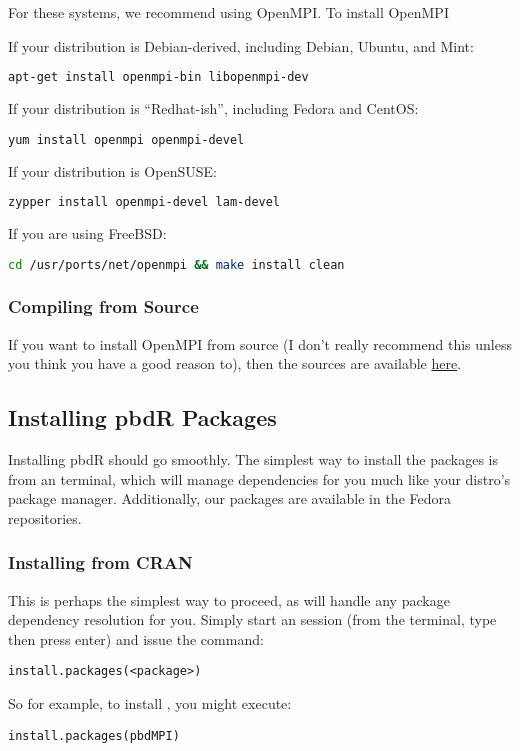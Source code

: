 For these systems, we recommend using OpenMPI.  To install OpenMPI

If your distribution is Debian-derived, including Debian, Ubuntu, and Mint:
\begin{lstlisting}[language=sh]
apt-get install openmpi-bin libopenmpi-dev
\end{lstlisting}

\vspace{.4cm}
If your distribution is ``Redhat-ish'', including Fedora and CentOS:
\begin{lstlisting}[language=sh]
yum install openmpi openmpi-devel
\end{lstlisting}

\vspace{.4cm}
If your distribution is OpenSUSE:
\begin{lstlisting}[language=sh]
zypper install openmpi-devel lam-devel
\end{lstlisting}

\vspace{.4cm}
If you are using FreeBSD:
\begin{lstlisting}[language=sh]
cd /usr/ports/net/openmpi && make install clean
\end{lstlisting}



\subsubsection{Compiling from Source}

If you want to install OpenMPI from source (I don't really recommend this unless you think you have a good reason to), then the sources are available \href{http://www.open-mpi.org/software/ompi/v1.6/}{here}.









\subsection{Installing pbdR Packages}
Installing pbdR should go smoothly.  The simplest way to install the packages is from an  terminal, which will manage dependencies for you much like your distro's package manager.  Additionally, our packages are available in the Fedora repositories.


\subsubsection{Installing from CRAN}
This is perhaps the simplest way to proceed, as  will handle any package dependency resolution for you.  Simply start an  session (from the terminal, type  then press enter) and issue the command:
\begin{lstlisting}[language=rr]
install.packages(<package>)
\end{lstlisting}
So for example, to install , you might execute:
\begin{lstlisting}[language=rr]
install.packages(pbdMPI)
\end{lstlisting}


